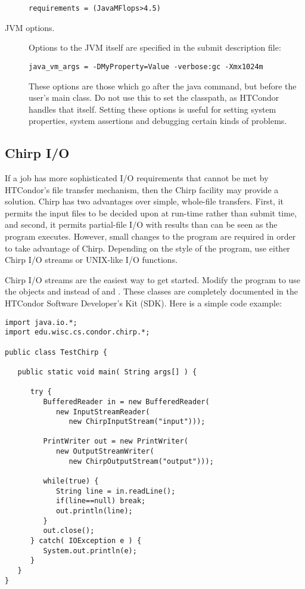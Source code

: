 \begin{description}
\begin{verbatim}
requirements = (JavaMFlops>4.5)
\end{verbatim}

\item[JVM options.]
Options to the JVM itself are specified in the 
submit description file:

\begin{verbatim}
java_vm_args = -DMyProperty=Value -verbose:gc -Xmx1024m
\end{verbatim}

These options are those which go after the java command, but before
the user's main class.  Do not use this to set the classpath, as
HTCondor handles that itself.  Setting these options is useful for
setting system properties, system assertions and debugging certain
kinds of problems.

\end{description}

\subsection{Chirp I/O}

If a job has more sophisticated I/O requirements that cannot
be met by HTCondor's file transfer mechanism,
then the Chirp facility may provide a solution.
Chirp has two advantages over simple, whole-file transfers.
First, it permits the input files to be decided upon at run-time
rather than submit time, and second,
it permits partial-file I/O with results than can be seen as the
program executes.
However, small changes to the program are required
in order to take advantage of Chirp.
Depending on the style of the program, use either Chirp I/O streams
or UNIX-like I/O functions.

Chirp I/O streams are the easiest way to get started.
Modify the program to use the objects 
and  instead of  and
.
These classes are completely documented
in the HTCondor Software Developer's Kit (SDK).
Here is a simple code example:

\begin{verbatim}
import java.io.*;
import edu.wisc.cs.condor.chirp.*;

public class TestChirp {

   public static void main( String args[] ) {

      try {
         BufferedReader in = new BufferedReader(
            new InputStreamReader(
               new ChirpInputStream("input")));

         PrintWriter out = new PrintWriter(
            new OutputStreamWriter(
               new ChirpOutputStream("output")));

         while(true) {
            String line = in.readLine();
            if(line==null) break;
            out.println(line);
         }
         out.close();
      } catch( IOException e ) {
         System.out.println(e);
      }
   }
}
\end{verbatim}

